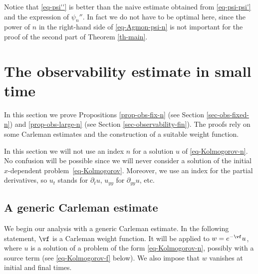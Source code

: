Notice that \eqref{eq-psi''} is better than the naive estimate obtained from \eqref{eq-psi-psi'} and the expression of $\psi_n''$. In fact we do not have to be optimal here, since the power of $n$ in the right-hand side of \eqref{eq-Agmon-psi-n} is not important for the proof of the second part of Theorem \ref{th-main}.

\section{The observability estimate in small time} \label{sec-Carleman}

In this section we prove Propositions \ref{prop-obs-fix-n} (see Section \ref{sec-obs-fixed-n}) and \ref{prop-obs-large-n} (see Section \ref{sec-observability-fin}). The proofs rely on some Carleman estimates and the construction of a suitable weight function.

In this section we will not use an index $n$ for a solution $u$ of \eqref{eq-Kolmogorov-n}. No confusion will be possible since we will never consider a solution of the initial $x$-dependent problem~\eqref{eq-Kolmogorov}. Moreover, we use an index for the partial derivatives, so $u_t$ stands for $\partial_t u$, $u_{yy}$ for $\partial_{yy} u$, etc.

\subsection{A generic Carleman estimate}

We begin our analysis with a generic Carleman estimate. In the following statement, $\vf$ is a Carleman weight function. It will be applied to $w = e^{-\vf} u$, where $u$ is a solution of a problem of the form \eqref{eq-Kolmogorov-n}, possibly with a source term (see \eqref{eq-Kolmogorov-f} below). We also impose that $w$ vanishes at initial and final times.

